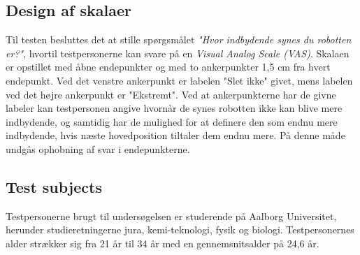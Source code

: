 \subsection*{Design af skalaer}
%
Til testen besluttes det at stille spørgsmålet \textit{"Hvor indbydende synes du robotten er?"}, hvortil testpersonerne kan svare på en \textit{Visual Analog Scale (VAS)}. Skalaen er opstillet med åbne endepunkter og med to ankerpunkter 1,5 cm fra hvert endepunkt. Ved det venstre ankerpunkt er labelen "Slet ikke" givet, mens labelen ved det højre ankerpunkt er "Ekstremt". Ved at ankerpunkterne har de givne labeler kan testpersonen angive hvornår de synes robotten ikke kan blive mere indbydende, og samtidig har de mulighed for at definere den som endnu mere indbydende, hvis næste hovedposition tiltaler dem endnu mere. På denne måde undgås ophobning af svar i endepunkterne.


\subsection*{Test subjects}
%
Testpersonerne brugt til undersøgelsen er studerende på Aalborg Universitet, herunder studieretningerne jura, kemi-teknologi, fysik og biologi. Testpersonernes alder strækker sig fra 21 år til 34 år med en gennemsnitsalder på 24,6 år.
